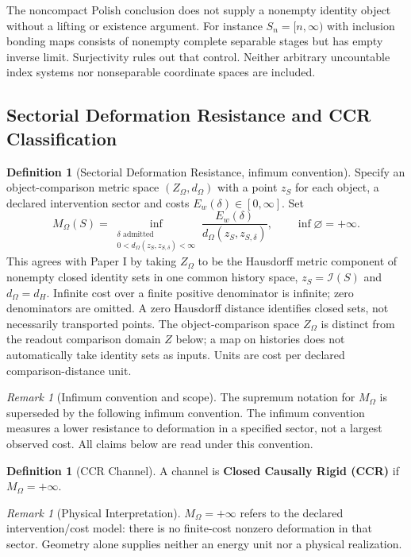 \documentclass[11pt,a4paper]{article}
\theoremstyle{plain}
\theoremstyle{definition}
\newtheorem{definition}[theorem]{Definition}
\theoremstyle{remark}
\newtheorem{remark}[theorem]{Remark}
\newcommand{\MO}{M_\Omega}
\begin{document}
The noncompact Polish conclusion does not supply a nonempty identity object
without a lifting or existence argument. For instance $S_n=[n,\infty)$ with
inclusion bonding maps consists of nonempty complete separable stages but has
empty inverse limit. Surjectivity rules out that control. Neither arbitrary
uncountable index systems nor nonseparable coordinate spaces are included.

\subsection{Sectorial Deformation Resistance and CCR Classification}

\begin{definition}[Sectorial Deformation Resistance, infimum convention]\label{def:paper3-ontmass}
Specify an object-comparison metric space $(Z_\Omega,d_\Omega)$ with a point
$z_S$ for each object, a declared intervention sector and costs
$E_w(\delta)\in[0,\infty]$. Set
\[
 \MO(S)=\inf_{\substack{\delta\text{ admitted}\\
                   0<d_\Omega(z_S,z_{S,\delta})<\infty}}
       \frac{E_w(\delta)}{d_\Omega(z_S,z_{S,\delta})},
 \qquad\inf\varnothing=+\infty.
\]
This agrees with Paper I by taking $Z_\Omega$ to be the Hausdorff metric
component of nonempty closed identity sets in one common history space,
$z_S=\mathcal I(S)$ and $d_\Omega=d_H$. Infinite cost over a finite positive
denominator is infinite; zero denominators are omitted. A zero Hausdorff
distance identifies closed sets, not necessarily transported points.
The object-comparison space $Z_\Omega$ is distinct from the readout comparison
domain $Z$ below; a map on histories does not automatically take identity
sets as inputs. Units are cost per declared comparison-distance unit.
\end{definition}

\begin{remark}[Infimum convention and scope]
The supremum notation for $\MO$ is superseded by the following infimum convention. The infimum convention measures a lower resistance to deformation in a specified sector, not a largest observed cost. All claims below are read under this convention.
\end{remark}

\begin{definition}[CCR Channel]
A channel is \textbf{Closed Causally Rigid (CCR)} if $\MO = +\infty$.
\end{definition}

\begin{remark}[Physical Interpretation]
$\MO=+\infty$ refers to the declared intervention/cost model: there is no finite-cost nonzero deformation in that sector. Geometry alone supplies neither an energy unit nor a physical realization.
\end{remark}
\end{document}
